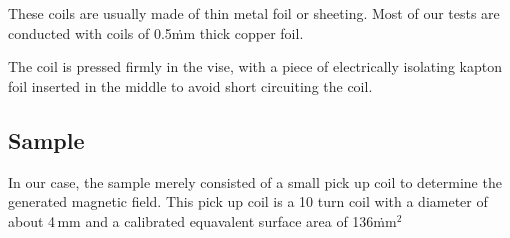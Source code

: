 These coils are usually made of thin metal foil or sheeting. Most of our tests are conducted with coils of 0.5\.mm thick copper foil.

The coil is pressed firmly in the vise, with a piece of electrically isolating kapton foil inserted in the middle to avoid short circuiting the coil.

\subsection{Sample}
In our case, the sample merely consisted of a small pick up coil to determine the generated magnetic field. This pick up coil is a 10 turn coil with a diameter of about 4\,mm and a calibrated equavalent surface area of 136\.mm$^2$
